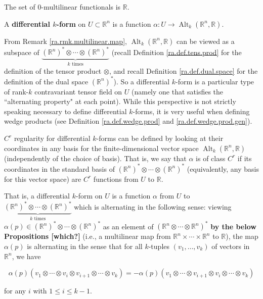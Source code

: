 \begin{example}\label{ra.ex.0.multi.ex}

The set of 0-multilinear functionals is \(\mathbb{R}\).

\end{example}

\begin{definition}\label{ra.def.diff.k.forms}

 A \textbf{differential \(k\)-form} on \(U \subset \mathbb{R}^n\) is a function \(\alpha: U \to \operatorname{Alt}_k(\mathbb{R}^n, \mathbb{R})\).



From Remark \ref{ra.rmk.multilinear.map}, \(\operatorname{Alt}_k(\mathbb{R}^n, \mathbb{R})\) can be viewed as a subspace of \(\underbrace{(\mathbb{R}^n)^* \otimes \cdots \otimes (\mathbb{R}^n)^*}_{k \text{ times}}\) (recall Definition \ref{ra.def.tens.prod} for the definition of the tensor product \(\otimes\), and recall Definition \ref{ra.def.dual.space} for the definition of the dual space \((\mathbb{R}^n)^*\)). So a differential \(k\)-form is a particular type of rank-\(k\) contravariant tensor field on \(U\) (namely one that satisfies the ``alternating property" at each point). While this perspective is not strictly speaking necessary to define differential \(k\)-forms, it is very useful when defining wedge products (see Definition \ref{ra.def.wedge.prod} and \ref{ra.def.wedge.prod.gen}).

\(C^r\) regularity for differential \(k\)-forms can be defined by looking at their coordinates in any basis for the finite-dimensional vector space \(\operatorname{Alt}_k(\mathbb{R}^n, \mathbb{R})\) (independently of the choice of basis). That is, we say that \(\alpha\) is of class \(C^r\) if its coordinates in the standard basis of \((\mathbb{R}^n)^* \otimes \cdots \otimes (\mathbb{R}^n)^*\) (equivalently, any basis for this vector space) are \(C^r\) functions from \(U\) to \(\mathbb{R}\).

That is, a differential \(k\)-form on \(U\) is a function \(\alpha\) from \(U\) to \( \underbrace{(\mathbb{R}^n)^* \otimes \cdots \otimes (\mathbb{R}^n)^*}_{k \text{ times}}\) which is alternating in the following sense: viewing \(\alpha(p) \in (\mathbb{R}^n)^* \otimes \cdots \otimes (\mathbb{R}^n)^*\) as an element of \((\mathbb{R}^n \otimes \cdots \otimes \mathbb{R}^n)^*\) \textbf{by the below Propositions [which?]} (i.e., a multilinear map from \(\mathbb{R}^n \times \cdots \times \mathbb{R}^n \) to \(\mathbb{R}\)), the map \(\alpha(p)\) is alternating in the sense that for all \(k\)-tuples \((v_1, \ldots, v_k)\) of vectors in \(\mathbb{R}^n\), we have

\[
\alpha(p)(v_1 \otimes \cdots \otimes v_i \otimes v_{i+1} \otimes \cdots \otimes v_k) = -\alpha(p)(v_1 \otimes \cdots \otimes v_{i+1}  \otimes v_i  \otimes \cdots \otimes v_k) 
\]

for any \(i\) with \( 1 \leq i \leq k-1\). 



\end{definition}



